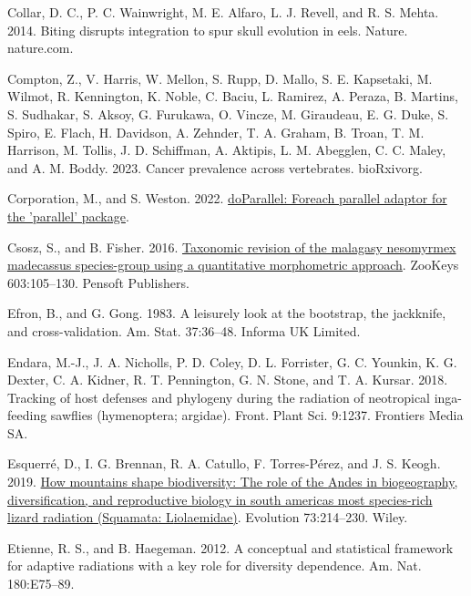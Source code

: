 \documentclass[fleqn,10pt,lineno]{wlpeerj} %
\newlength{\cslhangindent}
\newlength{\cslentryspacingunit} %
\newenvironment{CSLReferences}[2] %
 {%
  \setlength{\parindent}{0pt}
  \ifodd #1
  \let\oldpar\par
  \def\par{\hangindent=\cslhangindent\oldpar}
  \fi
  \setlength{\parskip}{#2\cslentryspacingunit}
 }%
 {}
\begin{document}
\begin{CSLReferences}{1}{0}
\leavevmode{}%
Collar, D. C., P. C. Wainwright, M. E. Alfaro, L. J. Revell, and R. S. Mehta. 2014. Biting disrupts integration to spur skull evolution in eels. Nature. nature.com.

\leavevmode{}%
Compton, Z., V. Harris, W. Mellon, S. Rupp, D. Mallo, S. E. Kapsetaki, M. Wilmot, R. Kennington, K. Noble, C. Baciu, L. Ramirez, A. Peraza, B. Martins, S. Sudhakar, S. Aksoy, G. Furukawa, O. Vincze, M. Giraudeau, E. G. Duke, S. Spiro, E. Flach, H. Davidson, A. Zehnder, T. A. Graham, B. Troan, T. M. Harrison, M. Tollis, J. D. Schiffman, A. Aktipis, L. M. Abegglen, C. C. Maley, and A. M. Boddy. 2023. Cancer prevalence across vertebrates. bioRxivorg.

\leavevmode{}%
Corporation, M., and S. Weston. 2022. \href{https://CRAN.R-project.org/package=doParallel}{doParallel: Foreach parallel adaptor for the 'parallel' package}.

\leavevmode{}%
Csosz, S., and B. Fisher. 2016. \href{https://doi.org/10.3897/zookeys.603.8271}{Taxonomic revision of the malagasy nesomyrmex madecassus species-group using a quantitative morphometric approach}. {ZooKeys} 603:105--130. Pensoft Publishers.

\leavevmode{}%
Efron, B., and G. Gong. 1983. A leisurely look at the bootstrap, the jackknife, and cross-validation. Am. Stat. 37:36--48. Informa UK Limited.

\leavevmode{}%
Endara, M.-J., J. A. Nicholls, P. D. Coley, D. L. Forrister, G. C. Younkin, K. G. Dexter, C. A. Kidner, R. T. Pennington, G. N. Stone, and T. A. Kursar. 2018. Tracking of host defenses and phylogeny during the radiation of neotropical inga-feeding sawflies (hymenoptera; argidae). Front. Plant Sci. 9:1237. Frontiers Media SA.

\leavevmode{}%
Esquerré, D., I. G. Brennan, R. A. Catullo, F. Torres-Pérez, and J. S. Keogh. 2019. \href{https://doi.org/10.1111/evo.13657}{How mountains shape biodiversity: The role of the {A}ndes in biogeography, diversification, and reproductive biology in south america{\textquotesingle}s most species-rich lizard radiation ({S}quamata: {L}iolaemidae)}. Evolution 73:214--230. Wiley.

\leavevmode{}%
Etienne, R. S., and B. Haegeman. 2012. A conceptual and statistical framework for adaptive radiations with a key role for diversity dependence. Am. Nat. 180:E75--89.


\end{CSLReferences}
\end{document}
